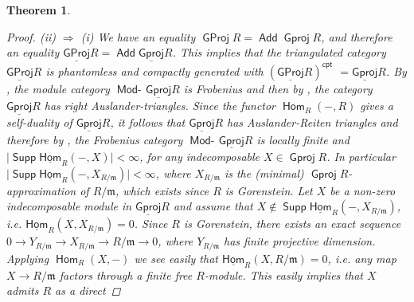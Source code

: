 \documentclass[oneside, a4paper,reqno]{amsart}
\numberwithin{equation}{section}
\newtheorem{thm}{Theorem}[section]
\theoremstyle{definition}
\begin{document}
\begin{thm}
\begin{proof}
(ii) $\Rightarrow$ (i) We have an equality ${\operatorname{\mathsf{GProj}}\nolimits} R = \operatorname*{\mathsf{Add}} {\operatorname{\mathsf{Gproj}}\nolimits}
R$, and therefore an equality ${\operatorname{\underline{\mathsf{GProj}}}\nolimits} R = \operatorname*{\mathsf{Add}} {\operatorname{\underline{\mathsf{Gproj}}}\nolimits} R$. This
implies that the triangulated category ${\operatorname{\underline{\mathsf{GProj}}}\nolimits} R$ is phantomless
 and compactly generated with $({\operatorname{\underline{\mathsf{GProj}}}\nolimits} R)^{\mathsf{cpt}}$ $=
{\operatorname{\underline{\mathsf{Gproj}}}\nolimits} R$. By \cite[Theorem 9.3]{B:3cats}, the module category
$\operatorname*{\mathsf{Mod}-\!}{\operatorname{\underline{\mathsf{Gproj}}}\nolimits} R$ is Frobenius and then by \cite[Lemma 10.1]{B:art},
the category ${\operatorname{\underline{\mathsf{Gproj}}}\nolimits} R$ has right Auslander-triangles. Since the
functor $\operatorname{\mathsf{Hom}}_{R}(-,R)$ gives a self-duality of ${\operatorname{\underline{\mathsf{Gproj}}}\nolimits} R$, it
follows that ${\operatorname{\underline{\mathsf{Gproj}}}\nolimits} R$ has Auslander-Reiten triangles and
therefore by \cite[Theorems 10.2, 10.3]{B:art}, the Frobenius
category $\operatorname*{\mathsf{Mod}-\!}{\operatorname{\underline{\mathsf{Gproj}}}\nolimits} R$ is locally finite and
$\lvert\operatorname*{\mathsf{Supp}}\operatorname*{\underline{\mathsf{Hom}}}_{R}(-,X)\rvert <\infty$, for any indecomposable $X
\in {\operatorname{\mathsf{Gproj}}\nolimits} R$. In particular
$\lvert\operatorname*{\mathsf{Supp}}\operatorname*{\underline{\mathsf{Hom}}}_{R}(-,X_{R/\mathfrak{m}})\rvert <\infty$, where
$X_{R/\mathfrak{m}}$ is the (minimal) ${\operatorname{\mathsf{Gproj}}\nolimits} R$-approximation of
$R/\mathfrak{m}$, which exists since $R$ is Gorenstein. Let $X$ be a
non-zero indecomposable module in ${\operatorname{\underline{\mathsf{Gproj}}}\nolimits} R$ and assume that $X
\notin \operatorname*{\mathsf{Supp}}\operatorname*{\underline{\mathsf{Hom}}}_{R}(-,X_{R/\mathfrak{m}})$, i.e.
$\operatorname*{\underline{\mathsf{Hom}}}_{R}(X,X_{R/\mathfrak{m}}) = 0$. Since $R$ is Gorenstein,
there exists an exact sequence $0 {\longrightarrow} Y_{R/\mathfrak{m}} {\longrightarrow}
X_{R/\mathfrak{m}} {\longrightarrow} R/\mathfrak{m} {\longrightarrow} 0$, where
$Y_{R/\mathfrak{m}}$ has finite projective dimension. Applying
$\operatorname{\mathsf{Hom}}_{R}(X,-)$  we see easily that $\operatorname*{\underline{\mathsf{Hom}}}_{R}(X,R/\mathfrak{m}) =
0$, i.e. any map $X {\longrightarrow} R/\mathfrak{m}$ factors through a finite
free $R$-module. This easily implies that $X$ admits $R$ as a direct

\end{proof}
\end{thm}
\end{document}
